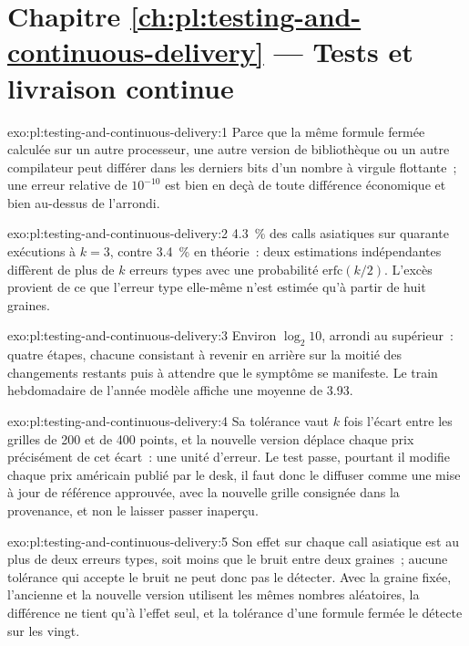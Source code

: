 \section*{Chapitre \ref{ch:pl:testing-and-continuous-delivery} --- Tests et livraison continue}

\begin{solution}{exo:pl:testing-and-continuous-delivery:1}
Parce que la même formule fermée calculée sur un autre processeur, une autre version de bibliothèque ou un autre compilateur peut différer dans les derniers bits d'un
nombre à virgule flottante~; une erreur relative de $10^{-10}$ est bien en deçà de toute différence économique et bien au-dessus de l'arrondi.
\end{solution}

\begin{solution}{exo:pl:testing-and-continuous-delivery:2}
4.3~\% des calls asiatiques sur quarante exécutions à $k=3$, contre 3.4~\% en théorie~: deux estimations indépendantes diffèrent de plus de $k$ erreurs types avec
une probabilité $\mathrm{erfc}(k/2)$. L'excès provient de ce que l'erreur type elle-même n'est estimée qu'à partir de huit graines.
\end{solution}

\begin{solution}{exo:pl:testing-and-continuous-delivery:3}
Environ $\log_2 10$, arrondi au supérieur~: quatre étapes, chacune consistant à revenir en arrière sur la moitié des changements restants puis à attendre que le symptôme se manifeste. Le train hebdomadaire de l'année modèle
affiche une moyenne de 3.93.
\end{solution}

\begin{solution}{exo:pl:testing-and-continuous-delivery:4}
Sa tolérance vaut $k$ fois l'écart entre les grilles de 200 et de 400 points, et la nouvelle version déplace chaque prix précisément de cet écart~: une unité
d'erreur. Le test passe, pourtant il modifie chaque prix américain publié par le desk, il faut donc le diffuser comme une mise à jour de référence approuvée, avec la nouvelle grille
consignée dans la provenance, et non le laisser passer inaperçu.
\end{solution}

\begin{solution}{exo:pl:testing-and-continuous-delivery:5}
Son effet sur chaque call asiatique est au plus de deux erreurs types, soit moins que le bruit entre deux graines~; aucune tolérance qui accepte le
bruit ne peut donc pas le détecter. Avec la graine fixée, l'ancienne et la nouvelle version utilisent les mêmes nombres aléatoires, la différence ne tient qu'à l'effet seul, et
la tolérance d'une formule fermée le détecte sur les vingt.
\end{solution}

